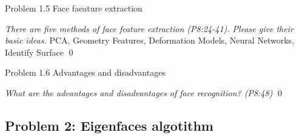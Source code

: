 \documentclass[
        ]{beamer}
\begin{document}
    		\begin{frame}[t]{Problem 1.5 Face faeature extraction}    		
    			\begin{overprint}
    			\emph{There are five methods of face feature extraction (P8:24-41). Please give their basic ideas.}
    			\onslide<2> 
    			PCA, Geometry Features, Deformation Models, Neural Networks, Identify Surface
    			\onslide<3> 
    			\onslide<4> 
    			\onslide<5> 
    			\onslide<6> 
    			\onslide<7> 
    			\onslide<8> 
    			\onslide<9> 
    			\onslide<10> 
    			\onslide<11> 
    			\onslide<12> 
    			\onslide<13> 
    			\onslide<14> 
    			\onslide<15> 
    			\onslide<16> 
    			\onslide<17> 
    			\onslide<18> 
    			\onslide<19> \qed		
    			\end{overprint}
    		\end{frame}
    
    		\begin{frame}[t]{Problem 1.6 Advantages and disadvantages}    		
    			\begin{overprint}
    			\onslide<1>
    			\emph{What are the advantages and disadvantages of face recognition? (P8:48)}
    			\onslide<2> \inpdfc{8}{48}\qed		
    			\end{overprint}
    		\end{frame}
    		
    \subsection{Problem 2: Eigenfaces algotithm}
    
\end{document}
